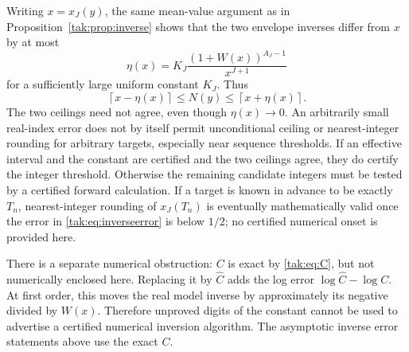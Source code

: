 \documentclass[11pt,letterpaper]{article}
\theoremstyle{remark}\newtheorem{remark}[theorem]{Remark}
\begin{document}
Writing $x=x_J(y)$, the same mean-value argument as in Proposition~\ref{tak:prop:inverse} shows that the two envelope inverses differ from $x$ by at most
\[
 \eta(x)=K_J\frac{(1+W(x))^{A_J-1}}{x^{J+1}}
\]
for a sufficiently large uniform constant $K_J$. Thus
\begin{equation}
 \left\lceil x-\eta(x)\right\rceil\leq N(y)
                   \leq\left\lceil x+\eta(x)\right\rceil.\label{tak:eq:rounding}
\end{equation}
The two ceilings need not agree, even though $\eta(x)\to0$. An arbitrarily small real-index error does not by itself permit unconditional ceiling or nearest-integer rounding for arbitrary targets, especially near sequence thresholds. If an effective interval and the constant are certified and the two ceilings agree, they do certify the integer threshold. Otherwise the remaining candidate integers must be tested by a certified forward calculation. If a target is known in advance to be exactly $T_n$, nearest-integer rounding of $x_J(T_n)$ is eventually mathematically valid once the error in \eqref{tak:eq:inverseerror} is below $1/2$; no certified numerical onset is provided here.

There is a separate numerical obstruction: $C$ is exact by \eqref{tak:eq:C}, but not numerically enclosed here. Replacing it by $\widehat C$ adds the log error $\log\widehat C-\log C$. At first order, this moves the real model inverse by approximately its negative divided by $W(x)$. Therefore unproved digits of the constant cannot be used to advertise a certified numerical inversion algorithm. The asymptotic inverse error statements above use the exact $C$.
\end{document}
